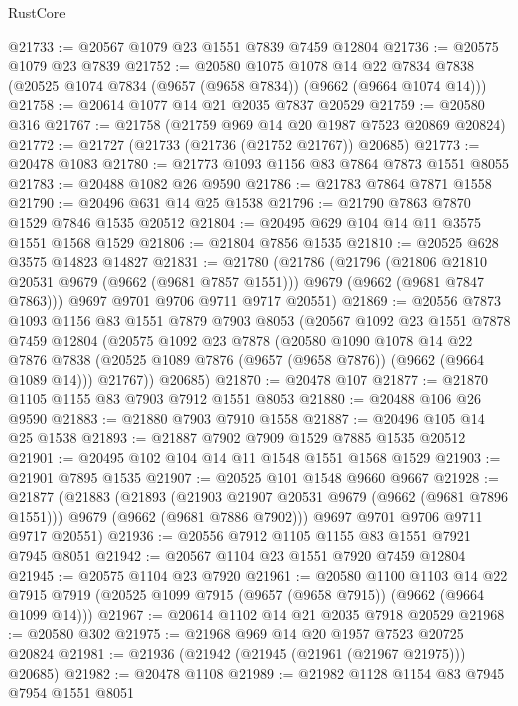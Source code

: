 \begin{lexlean}{RustCore}
\begin{coremodule}
@21733 := @20567 @1079 @23 @1551 @7839 @7459 @12804
@21736 := @20575 @1079 @23 @7839
@21752 := @20580
    @1075
    @1078
    @14
    @22
    @7834
    @7838
    (@20525 @1074 @7834 (@9657 (@9658 @7834)) (@9662 (@9664 @1074 @14)))
@21758 := @20614 @1077 @14 @21 @2035 @7837 @20529
@21759 := @20580 @316
@21767 := @21758 (@21759 @969 @14 @20 @1987 @7523 @20869 @20824)
@21772 := @21727 (@21733 (@21736 (@21752 @21767)) @20685)
@21773 := @20478 @1083
@21780 := @21773 @1093 @1156 @83 @7864 @7873 @1551 @8055
@21783 := @20488 @1082 @26 @9590
@21786 := @21783 @7864 @7871 @1558
@21790 := @20496 @631 @14 @25 @1538
@21796 := @21790 @7863 @7870 @1529 @7846 @1535 @20512
@21804 := @20495 @629 @104 @14 @11 @3575 @1551 @1568 @1529
@21806 := @21804 @7856 @1535
@21810 := @20525 @628 @3575 @14823 @14827
@21831 := @21780
    (@21786
      (@21796
        (@21806 @21810 @20531 @9679 (@9662 (@9681 @7857 @1551)))
        @9679
        (@9662 (@9681 @7847 @7863)))
      @9697
      @9701
      @9706
      @9711
      @9717
      @20551)
@21869 := @20556
    @7873
    @1093
    @1156
    @83
    @1551
    @7879
    @7903
    @8053
    (@20567
      @1092
      @23
      @1551
      @7878
      @7459
      @12804
      (@20575
        @1092
        @23
        @7878
        (@20580
          @1090
          @1078
          @14
          @22
          @7876
          @7838
          (@20525 @1089 @7876 (@9657 (@9658 @7876)) (@9662 (@9664 @1089 @14)))
          @21767))
      @20685)
@21870 := @20478 @107
@21877 := @21870 @1105 @1155 @83 @7903 @7912 @1551 @8053
@21880 := @20488 @106 @26 @9590
@21883 := @21880 @7903 @7910 @1558
@21887 := @20496 @105 @14 @25 @1538
@21893 := @21887 @7902 @7909 @1529 @7885 @1535 @20512
@21901 := @20495 @102 @104 @14 @11 @1548 @1551 @1568 @1529
@21903 := @21901 @7895 @1535
@21907 := @20525 @101 @1548 @9660 @9667
@21928 := @21877
    (@21883
      (@21893
        (@21903 @21907 @20531 @9679 (@9662 (@9681 @7896 @1551)))
        @9679
        (@9662 (@9681 @7886 @7902)))
      @9697
      @9701
      @9706
      @9711
      @9717
      @20551)
@21936 := @20556 @7912 @1105 @1155 @83 @1551 @7921 @7945 @8051
@21942 := @20567 @1104 @23 @1551 @7920 @7459 @12804
@21945 := @20575 @1104 @23 @7920
@21961 := @20580
    @1100
    @1103
    @14
    @22
    @7915
    @7919
    (@20525 @1099 @7915 (@9657 (@9658 @7915)) (@9662 (@9664 @1099 @14)))
@21967 := @20614 @1102 @14 @21 @2035 @7918 @20529
@21968 := @20580 @302
@21975 := @21968 @969 @14 @20 @1957 @7523 @20725 @20824
@21981 := @21936 (@21942 (@21945 (@21961 (@21967 @21975))) @20685)
@21982 := @20478 @1108
@21989 := @21982 @1128 @1154 @83 @7945 @7954 @1551 @8051

\end{coremodule}
\end{lexlean}
